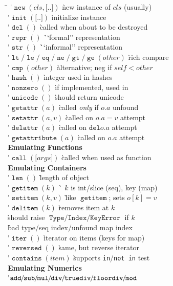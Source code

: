 \documentclass[landscape,10pt,letterpaper]{article}
\newcommand{\pyf}[1]{\ensuremath{\mathop{\mathtt{#1}}}}
\newcommand{\pys}[1]{\ensuremath{\mathtt{#1}}}
\newcommand{\pyt}[1]{\pyf{#1}}
\newcommand{\optional}[1]{{[}{#1}{]}}
\newcommand{\thead}[1]{\` {\large \textbf{#1}} \\}
\newcommand{\Slash}{\hspace{-.25em}/\hspace{-.25em}}
\begin{document}
\begin{multicols}{6}
\begin{tabbing}
\hspace{2em}\= \kill
\'$\pyf{new}(cls, \optional{..})$ \` new instance of $cls$ (usually) \\
\'$\pyf{init}(\optional{..})$ \` initialize instance \\
\'$\pyf{del}()$ \` called when about to be destroyed \\
\'$\pyf{repr}()$ \` ``formal'' representation \\
\'$\pyf{str}()$ \` ``informal'' representation \\
\'$\pyf{lt}\!/\!\pyf{le}\!/\!\pyf{eq}\!/\!\pyf{ne}\!/\!\pyf{gt}\!/\!\pyf{ge}(other)$ \` rich compare \\
\'$\pyf{cmp}(other)$ \` alternative; neg if $sel\!f\!<\!other$ \\
\'$\pyf{hash}()$ \` integer used in hashes \\
\'$\pyf{nonzero}()$ \` if implemented, used in \pyf{bool()} \\
\'$\pyf{unicode}()$ \` should return unicode \\
\'$\pyf{getattr}(a)$ \` called \emph{only} if $o.a$ unfound \\
\'$\pyf{setattr}(a, v)$ \` called on $o.a=v$ attempt \\
\'$\pyf{delattr}(a)$ \` called on $\pys{del} o.a$ attempt \\
\'$\pyf{getattribute}(a)$ \` called on $o.a$ attempt \\
\thead{Emulating Functions}
\'$\pyf{call}(\optional{args})$ \` called when used as function \\
\thead{Emulating Containers}
\'$\pyf{len}()$ \` length of object \\
\'$\pyf{getitem}(k)$ \` $k$ is int/slice (seq), key (map) \\
\'$\pyf{setitem}(k,v)$ \` like $\pyt{getitem}$; sets $o[k]=v$ \\
\'$\pyf{delitem}(k)$ \` removes item at $k$ \\
\` should raise \pyt{Type/Index/KeyError} if $k$ \\
\` bad type/seq index/unfound map index \\
\'$\pyf{iter}()$ \` iterator on items (keys for map) \\
\'$\pyf{reversed}()$ \` same, but reverse iterator \\
\'$\pyf{contains}(item)$ \` supports \verb.in./\verb.not in. test \\
\thead{Emulating Numerics}
\'$\pyf{add}\Slash{}\pyf{sub}\Slash{}\pyf{mul}\Slash{}\pyf{div}\Slash{}\pyf{truediv}\Slash{}\pyf{floordiv}\Slash{}\pyf{mod}$\\

\end{tabbing}
\end{multicols}
\end{document}
